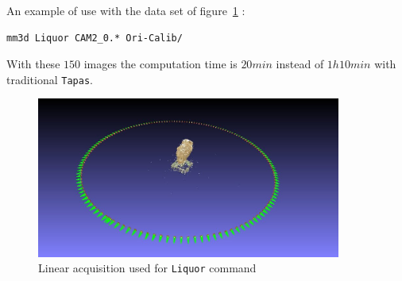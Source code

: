 An example of use with the data set of figure~\ref{FIG:Liquor:DataMap} :

\begin{verbatim}
mm3d Liquor CAM2_0.* Ori-Calib/
\end{verbatim}


With these $150$ images the computation time is $20 min$ instead of $1h10min$ with traditional {\tt Tapas}.

\begin{figure}[H]
\begin{center}
\includegraphics[width=100mm]{FIGS/Ange/LineAcq.jpg}
\end{center}
\caption{Linear acquisition used for {\tt Liquor} command}
\label{FIG:Liquor:DataMap}
\end{figure}


